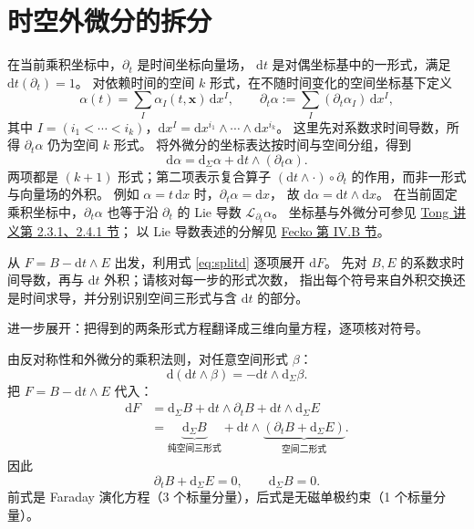 \documentclass[UTF8,11pt,openany]{ctexbook}
\numberwithin{equation}{chapter}
\theoremstyle{definition}
\theoremstyle{remark}
\newcommand{\dd}{\mathrm d}
\begin{document}
\section{时空外微分的拆分}
在当前乘积坐标中，$\partial_t$ 是时间坐标向量场，
$\dd t$ 是对偶坐标基中的一形式，满足 $\dd t(\partial_t)=1$。
对依赖时间的空间 $k$ 形式，在不随时间变化的空间坐标基下定义
\[
\alpha(t)=\sum_I\alpha_I(t,\bm x)\,\dd x^I,\qquad
\partial_t\alpha:=\sum_I(\partial_t\alpha_I)\,\dd x^I,
\]
其中 $I=(i_1<\cdots<i_k)$，$\dd x^I=\dd x^{i_1}\wedge\cdots\wedge\dd x^{i_k}$。
这里先对系数求时间导数，所得 $\partial_t\alpha$ 仍为空间 $k$ 形式。
将外微分的坐标表达按时间与空间分组，得到
\begin{equation}\label{eq:splitd}
\dd\alpha=\dd_\Sigma\alpha+\dd t\wedge(\partial_t\alpha).
\end{equation}
两项都是 $(k+1)$ 形式；第二项表示复合算子
$(\dd t\wedge\cdot)\circ\partial_t$ 的作用，而非一形式与向量场的外积。
例如 $\alpha=t\,\dd x$ 时，$\partial_t\alpha=\dd x$，
故 $\dd\alpha=\dd t\wedge\dd x$。
在当前固定乘积坐标中，$\partial_t\alpha$ 也等于沿 $\partial_t$ 的
Lie 导数 $\mathcal L_{\partial_t}\alpha$。
坐标基与外微分可参见
\href{https://www.davidtong.org/teaching/general-relativity/grhtml/S2}{Tong 讲义第 2.3.1、2.4.1 节}；
以 Lie 导数表述的分解见
\href{https://arxiv.org/abs/gr-qc/9701066}{Fecko 第 IV.B 节}。

\begin{askai}
从 $F=B-\dd t\wedge E$ 出发，利用式 \eqref{eq:splitd} 逐项展开 $\dd F$。
先对 $B,E$ 的系数求时间导数，再与 $\dd t$ 外积；请核对每一步的形式次数，
指出每个符号来自外积交换还是时间求导，并分别识别空间三形式与含 $\dd t$ 的部分。

进一步展开：把得到的两条形式方程翻译成三维向量方程，逐项核对符号。
\end{askai}
由反对称性和外微分的乘积法则，对任意空间形式 $\beta$：
\begin{equation}
\dd(\dd t\wedge\beta)=-\dd t\wedge\dd_\Sigma\beta.
\end{equation}
把 $F=B-\dd t\wedge E$ 代入：
\begin{align}
\dd F
 &=\dd_\Sigma B+\dd t\wedge\partial_tB
   +\dd t\wedge\dd_\Sigma E\\
 &=\underbrace{\dd_\Sigma B}_{\text{纯空间三形式}}
  +\dd t\wedge\underbrace{(\partial_tB+\dd_\Sigma E)}_{\text{空间二形式}}.
\end{align}
因此
\begin{equation}\label{eq:splitFaraday}
\boxed{\partial_tB+\dd_\Sigma E=0,\qquad \dd_\Sigma B=0.}
\end{equation}
前式是 Faraday 演化方程（3 个标量分量），后式是无磁单极约束（1 个标量分量）。
\end{document}
